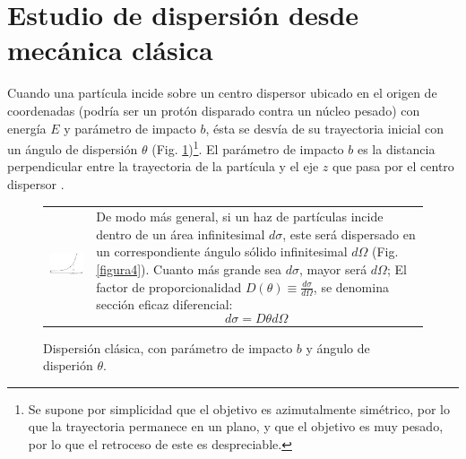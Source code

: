 \section{Estudio de dispersi\'on desde mec\'anica cl\'asica}
Cuando una part\'icula incide sobre un centro dispersor ubicado en el origen de coordenadas (podr\'ia ser un prot\'on
disparado contra un n\'ucleo pesado) con energ\'ia $E$ y par\'ametro de impacto $b$, \'esta se desv\'ia de su trayectoria inicial
con un \'angulo de dispersi\'on $\theta$ (Fig. \ref{figura3})\footnote{Se supone por simplicidad que el objetivo es
azimutalmente sim\'etrico, por lo que la trayectoria permanece en un plano, y que el objetivo
es muy pesado, por lo que el retroceso de este es despreciable.}. El par\'ametro de impacto $b$ es la distancia perpendicular entre la trayectoria de la part\'icula y el eje $z$ que pasa por el centro dispersor \cite{griphys}.
\begin{figure}[H]
\begin{tabular}{p{7cm}p{7.45cm}}
\begin{minipage}[l]{7cm}
\includegraphics[width=7cm]{Imagenes/figurastesis/dispersor.pdf}
\caption{Dispersi\'on cl\'asica, con par\'ametro de impacto $b$ y \'angulo de disperi\'on $\theta$.}\label{figura3}
\end{minipage}
&
\begin{minipage}[r]{7.45cm}
De modo m\'as general, si un haz de  part\'iculas incide dentro de un  \'area infinitesimal $d\sigma$, este ser\'a dispersado en un correspondiente \'angulo s\'olido infinitesimal \textit{$d\Omega$} (Fig. \ref{figura4}). Cuanto m\'as grande sea $d\sigma$, mayor ser\'a $d\Omega$; El factor de proporcionalidad $D(\theta)\equiv \frac{d\sigma}{d\Omega}$, se denomina secci\'on eficaz diferencial:
\begin{equation}
d\sigma=D\theta d\Omega
\end{equation}
\end{minipage}
\end{tabular}
\end{figure}
